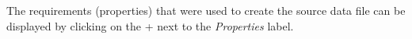 \documentclass{tufte-book} %
\begin{document}
The requirements (properties) that were used to create the source data file can be displayed by clicking on the + next to the \emph{Properties} label.






\end{document}
